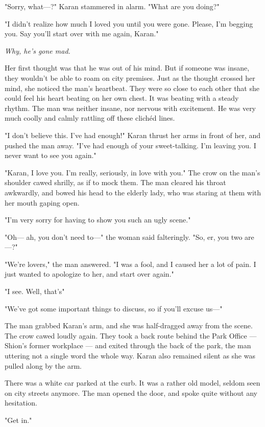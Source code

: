 "Sorry, what---?" Karan stammered in alarm. "What are you doing?"

"I didn't realize how much I loved you until you were gone. Please, I'm
begging you. Say you'll start over with me again, Karan."

\emph{Why, he's gone mad.}

Her first thought was that he was out of his mind. But if someone was
insane, they wouldn't be able to roam on city premises. Just as the
thought crossed her mind, she noticed the man's heartbeat. They were so
close to each other that she could feel his heart beating on her own
chest. It was beating with a steady rhythm. The man was neither insane,
nor nervous with excitement. He was very much coolly and calmly rattling
off these clichéd lines.

"I don't believe this. I've had enough!" Karan thrust her arms in front
of her, and pushed the man away. "I've had enough of your sweet-talking.
I'm leaving you. I never want to see you again."

"Karan, I love you. I'm really, seriously, in love with you." The crow
on the man's shoulder cawed shrilly, as if to mock them. The man cleared
his throat awkwardly, and bowed his head to the elderly lady, who was
staring at them with her mouth gaping open.

"I'm very sorry for having to show you such an ugly scene."

"Oh--- ah, you don't need to---" the woman said falteringly. "So, er, you
two are---?"

"We're lovers," the man answered. "I was a fool, and I caused her a lot
of pain. I just wanted to apologize to her, and start over again."

"I see. Well, that's\el "

"We've got some important things to discuss, so if you'll excuse us---"

The man grabbed Karan's arm, and she was half-dragged away from the
scene. The crow cawed loudly again. They took a back route behind the
Park Office --- Shion's former workplace --- and exited through the back of
the park, the man uttering not a single word the whole way. Karan also
remained silent as she was pulled along by the arm.

There was a white car parked at the curb. It was a rather old model,
seldom seen on city streets anymore. The man opened the door, and spoke
quite without any hesitation.

"Get in."

